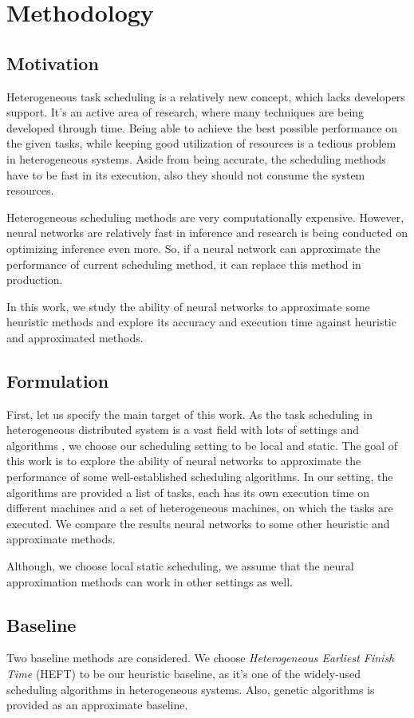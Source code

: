 \documentclass[twocolumn,11pt]{IEEEtran}
\begin{document}
\section{Methodology}

\subsection{Motivation}
Heterogeneous task scheduling is a relatively new concept, which lacks developers support. It's an active area of research, where many techniques are being developed through time. Being able to achieve the best possible performance on the given tasks, while keeping good utilization of resources is a tedious problem in heterogeneous systems. Aside from being accurate, the scheduling methods have to be fast in its execution, also they should not consume the system resources. 

Heterogeneous scheduling methods are very computationally expensive. However, neural networks are relatively fast in inference and research is being conducted on optimizing inference even more. So, if a neural network can approximate the performance of current scheduling method, it can replace this method in production. 

In this work, we study the ability of neural networks to approximate some heuristic methods and explore its accuracy and execution time against heuristic and approximated methods.

\subsection{Formulation}
First, let us specify the main target of this work. As the task scheduling in heterogeneous distributed system is a vast field with lots of settings and algorithms \cite{inbook}, we choose our scheduling setting to be local and static. The goal of this work is to explore the ability of neural networks to approximate the performance of some well-established scheduling algorithms. In our setting, the algorithms are provided a list of tasks, each has its own execution time on different machines and a set of heterogeneous machines, on which the tasks are executed. We compare the results neural networks to some other heuristic and approximate methods.

Although, we choose local static scheduling, we assume that the neural approximation methods can work in other settings as well.

\subsection{Baseline}
Two baseline methods are considered. We choose \emph{Heterogeneous Earliest Finish Time} (HEFT) \cite{993206} to be our heuristic baseline, as it's one of the widely-used scheduling algorithms in heterogeneous systems. Also, genetic algorithms \cite{article2} is provided as an approximate baseline. \\
\end{document}
